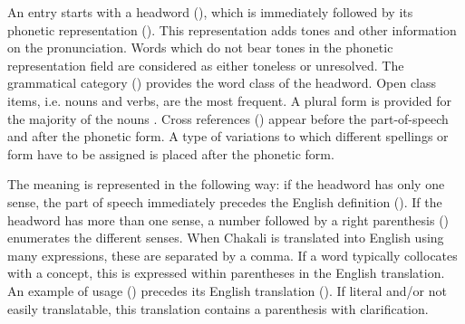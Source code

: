 \begin{table}[h]
\caption[]{Illustrations of the Chakali-English dictionary 
entry\label{tab:illu-dict}}
 \begin{center}
\end{center}
\end{table}


An entry starts with a  headword (), which is immediately followed by 
its phonetic representation (). This representation adds tones and 
other information on the pronunciation. Words which do not bear tones in the 
phonetic representation field are considered as either toneless or  unresolved. 
The grammatical category () provides  the word class of the headword. 
Open class items, i.e. nouns and verbs,  are the most frequent. A plural form  
is provided for the majority of the nouns . Cross references  
() appear before the part-of-speech and after the phonetic form. A 
type of variations to which different spellings or form have to be assigned is 
placed after the phonetic form. 


The meaning  is represented in the following way: if the headword has only one 
sense,  the part of speech immediately precedes the English definition 
().  If the headword has more than one sense,  a number followed by a 
right parenthesis () enumerates the different senses. When Chakali is 
translated into English using many expressions, these are separated by a comma. 
If a word typically collocates with a concept, this is expressed within  
parentheses in the English translation.  An example of usage () 
precedes its English translation (). If literal and/or not easily 
translatable, this translation contains a parenthesis with clarification.


